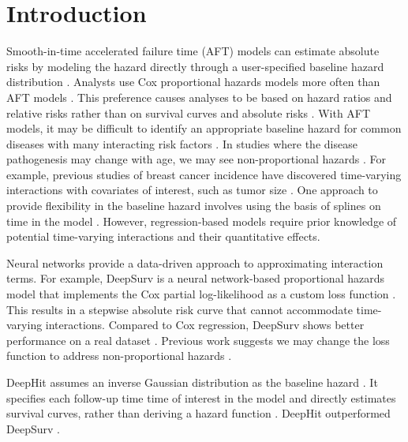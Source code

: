 \documentclass[APA,LATO1COL]{WileyNJD-v2}
\begin{document}



\maketitle




\hypertarget{introduction}{%
\section{Introduction}\label{introduction}}



Smooth-in-time accelerated failure time (AFT) models can estimate absolute
risks by modeling the hazard directly through a user-specified baseline hazard
distribution \citep{kleinbaum2012survival}. Analysts use Cox proportional hazards
models more often than AFT models \citep{hanley2009}. This preference causes
analyses to be based on hazard ratios and relative risks rather than on survival
curves and absolute risks \citep{hanley2009}. With AFT models, it may be difficult
to identify an appropriate baseline hazard for common diseases with many
interacting risk factors \citep{royston2002flexible}. In studies where the disease
pathogenesis may change with age, we may see non-proportional hazards
\citep{coradini2000time}. For example, previous studies of breast cancer incidence
have discovered time-varying interactions with covariates of interest, such as tumor
size \citep{coradini2000time}. One approach to provide flexibility in the baseline hazard
involves using the basis of splines on time in the model \citep{royston2002flexible}.
However, regression-based models require prior knowledge of potential time-varying
interactions and their quantitative effects.


Neural networks provide a data-driven approach to approximating interaction terms.
For example, DeepSurv is a neural network-based proportional hazards model that
implements the Cox partial log-likelihood as a custom loss function \citep{katzman2018DeepSurv}.
This results in a stepwise absolute risk curve that cannot accommodate time-varying interactions.
Compared to Cox regression, DeepSurv shows better performance on a real dataset
\citep{katzman2018DeepSurv}. Previous work suggests we may change the loss function
to address non-proportional hazards \citep{faraggi1995neural}.

DeepHit assumes an inverse Gaussian distribution as the baseline hazard \citep{lee2018DeepHit}.
It specifies each follow-up time time of interest in the model and directly estimates survival curves, rather
than deriving a hazard function \citep{lee2018DeepHit}. DeepHit outperformed DeepSurv
\citep{lee2018DeepHit}.
\end{document}
